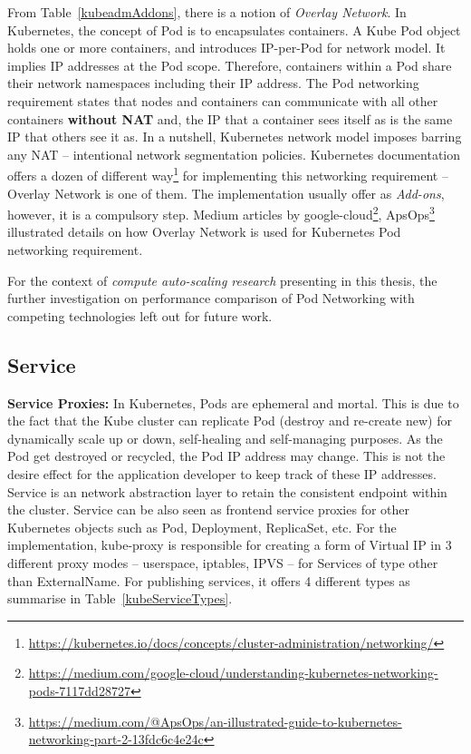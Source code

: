 From Table~\ref{kubeadmAddons}, there is a notion of \emph{Overlay Network}. In Kubernetes, the concept of Pod is to encapsulates containers. A Kube Pod object holds one or more containers, and introduces IP-per-Pod for network model. It implies IP addresses at the Pod scope. Therefore, containers within a Pod share their network namespaces including their IP address. The Pod networking requirement\parencite{kubeDoc} states that nodes and containers can communicate with all other containers \textbf{without NAT} and, the IP that a container sees itself as is the same IP that others see it as. In a nutshell, Kubernetes network model imposes barring any NAT -- intentional network segmentation policies. Kubernetes documentation offers a dozen of different way\footnote{\url{https://kubernetes.io/docs/concepts/cluster-administration/networking/}} for implementing this networking requirement -- Overlay Network is one of them. The implementation usually offer as \emph{Add-ons}, however, it is a compulsory step. Medium articles by google-cloud\footnote{\url{https://medium.com/google-cloud/understanding-kubernetes-networking-pods-7117dd28727}}, ApsOps\footnote{\url{https://medium.com/@ApsOps/an-illustrated-guide-to-kubernetes-networking-part-2-13fdc6c4e24c}} illustrated details on how Overlay Network is used for Kubernetes Pod networking requirement.

For the context of \emph{compute auto-scaling research} presenting in this thesis, the further investigation on performance comparison of Pod Networking with competing technologies left out for future work.

\subsection{Service}
\label{kubeService}
\noindent \textbf{Service Proxies:} \quad In Kubernetes, Pods are ephemeral and mortal. This is due to the fact that the Kube cluster can replicate Pod (destroy and re-create new) for dynamically scale up or down, self-healing and self-managing purposes. As the Pod get destroyed or recycled, the Pod IP address may change. This is not the desire effect for the application developer to keep track of these IP addresses. Service is an network abstraction layer to retain the consistent endpoint within the cluster. Service can be also seen as frontend service proxies for other Kubernetes objects such as Pod, Deployment, ReplicaSet, etc. For the implementation, kube-proxy is responsible for creating a form of Virtual IP in 3 different proxy modes -- userspace, iptables, IPVS --  for Services of type other than ExternalName. For publishing services, it offers 4 different types as summarise in Table~\ref{kubeServiceTypes}.

